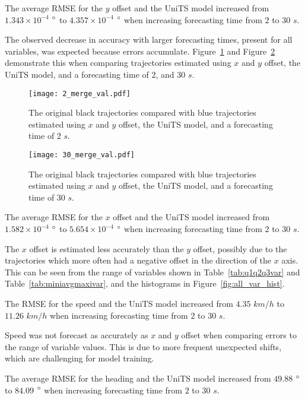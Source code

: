 \documentclass[preprint,12pt]{elsarticle}
\begin{document}
The average RMSE for the $y$ offset and the UniTS model increased from $1.343 \times 10^{-4}$ $\degree$ to $4.357 \times 10^{-4}$ $\degree$ when increasing forecasting time from $2$ to $30$ $s$.

The observed decrease in accuracy with larger forecasting times, present for all variables, was expected because errors accumulate. Figure~\ref{fig:2_merge_val} and Figure~\ref{fig:30_merge_val} demonstrate this when comparing trajectories estimated using $x$ and $y$ offset, the UniTS model, and a forecasting time of $2$, and $30$ $s$.

\begin{figure}[!ht]
    \centering
    \texttt{[image: 2\_merge\_val.pdf]}
    \caption{The original black trajectories compared with blue trajectories estimated using $x$ and $y$ offset, the UniTS model, and a forecasting time of $2$ $s$.}
    \label{fig:2_merge_val}
\end{figure}

\begin{figure}[!ht]
    \centering
    \texttt{[image: 30\_merge\_val.pdf]}
    \caption{The original black trajectories compared with blue trajectories estimated using $x$ and $y$ offset, the UniTS model, and a forecasting time of $30$ $s$.}
    \label{fig:30_merge_val}
\end{figure}

The average RMSE for the $x$ offset and the UniTS model increased from $1.582 \times 10^{-4}$ $\degree$ to $5.654 \times 10^{-4}$ $\degree$ when increasing forecasting time from $2$ to $30$ $s$.

The $x$ offset is estimated less accurately than the $y$ offset, possibly due to the trajectories which more often had a negative offset in the direction of the $x$ axis. This can be seen from the range of variables shown in Table~\ref{tab:q1q2q3var} and Table~\ref{tab:miniavgmaxivar}, and the histograms in Figure~\ref{fig:all_var_hist}.

The RMSE for the speed and the UniTS model increased from $4.35$ $km/h$ to $11.26$ $km/h$ when increasing forecasting time from $2$ to $30$ $s$.

Speed was not forecast as accurately as $x$ and $y$ offset when comparing errors to the range of variable values. This is due to more frequent unexpected shifts, which are challenging for model training.

The average RMSE for the heading and the UniTS model increased from $49.88$ $\degree$ to $84.09$ $\degree$ when increasing forecasting time from $2$ to $30$ $s$.
\end{document}
